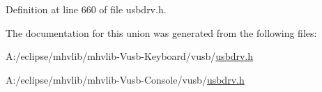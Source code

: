 Definition at line 660 of file usbdrv.\-h.



The documentation for this union was generated from the following files\-:\begin{DoxyCompactItemize}
\item 
A\-:/eclipse/mhvlib/mhvlib-\/\-Vusb-\/\-Keyboard/vusb/\hyperlink{mhvlib-_vusb-_keyboard_2vusb_2usbdrv_8h}{usbdrv.\-h}\item 
A\-:/eclipse/mhvlib/mhvlib-\/\-Vusb-\/\-Console/vusb/\hyperlink{mhvlib-_vusb-_console_2vusb_2usbdrv_8h}{usbdrv.\-h}\end{DoxyCompactItemize}
